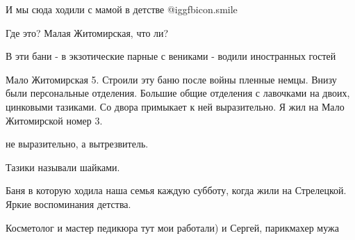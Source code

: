И мы сюда ходили с мамой в детстве  @igg{fbicon.smile} 

Где это? Малая Житомирская, что ли?

В эти бани - в экзотические парные с вениками - водили иностранных гостей


Мало Житомирская 5. Строили эту баню после войны пленные немцы. Внизу были
персональные отделения. Большие общие отделения с лавочками на двоих, цинковыми
тазиками. Со двора примыкает к ней выразительно. Я жил на Мало Житомирской
номер 3.

не выразительно, а вытрезвитель.

Тазики называли шайками.


Баня в которую ходила наша семья каждую субботу, когда жили на Стрелецкой.
Яркие воспоминания детства.


Косметолог и мастер педикюра тут мои работали) и Сергей, парикмахер мужа
